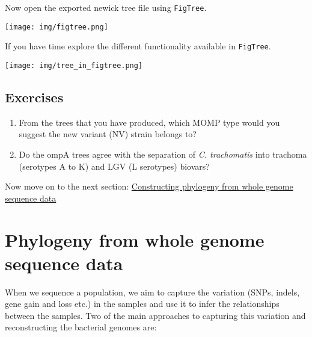 \documentclass[11pt]{article}
\providecommand{\tightlist}{%
      \setlength{\itemsep}{0pt}\setlength{\parskip}{0pt}}
\begin{document}
    Now open the exported newick tree file using \texttt{FigTree}.


\begin{center}
\texttt{[image: img/figtree.png]}
\end{center}


If you have time explore the different functionality available in
\texttt{FigTree}.


\begin{center}
\texttt{[image: img/tree\_in\_figtree.png]}
\end{center}


    \hypertarget{exercises}{%
\subsection{Exercises}\label{exercises}}

\begin{enumerate}
\def\labelenumi{\arabic{enumi}.}
\tightlist
\item
  From the trees that you have produced, which MOMP type would you
  suggest the new variant (NV) strain belongs to?
\item
  Do the ompA trees agree with the separation of \textit{C. trachomatis}
  into trachoma (serotypes A to K) and LGV (L serotypes) biovars?
\end{enumerate}

    Now move on to the next section: \href{snp_phylogeny.ipynb}{Constructing
phylogeny from whole genome sequence data}





\newpage





    \hypertarget{phylogeny-from-whole-genome-sequence-data}{%
\section{Phylogeny from whole genome sequence
data}\label{phylogeny-from-whole-genome-sequence-data}}

    When we sequence a population, we aim to capture the variation (SNPs,
indels, gene gain and loss etc.) in the samples and use it to infer the
relationships between the samples. Two of the main approaches to
capturing this variation and reconstructing the bacterial genomes are:
\end{document}
